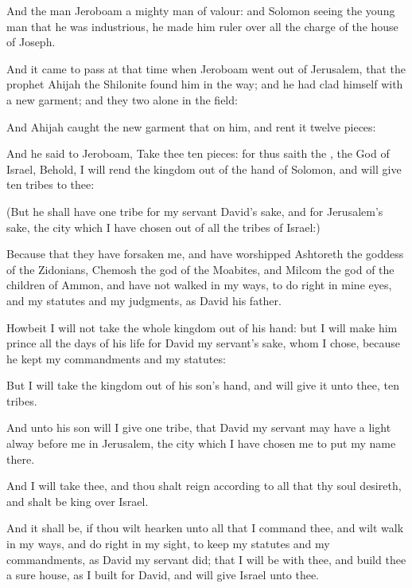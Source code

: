{And the
man
Jeroboam
{} a mighty
man of
valour: and
Solomon
seeing the young
man that he was
industrious, he made him
ruler over all the
charge of the
house of
Joseph.

And it came to pass at that
time when
Jeroboam went
out of
Jerusalem, that the
prophet
Ahijah the
Shilonite
found him in the
way; and he had
clad himself with a
new
garment; and they
two
{} alone in the
field:

And
Ahijah
caught the
new
garment that
{} on him, and
rent it
{}
twelve
pieces:

And he
said to
Jeroboam,
Take thee
ten
pieces: for thus
saith the
{}, the
God of
Israel, Behold, I will
rend the
kingdom out of the
hand of
Solomon, and will
give
ten
tribes to thee:

(But he shall have
one
tribe for my
servant
David’s sake, and for
Jerusalem’s sake, the
city which I have
chosen out of all the
tribes of
Israel:)

Because that they have
forsaken me, and have
worshipped
Ashtoreth the
goddess of the
Zidonians,
Chemosh the
god of the
Moabites, and
Milcom the
god of the
children of
Ammon, and have not
walked in my
ways, to
do
{}
right in mine
eyes, and
{} my
statutes and my
judgments, as
{}
David his
father.

Howbeit I will not
take the whole
kingdom out of his
hand: but I will
make him
prince all the
days of his
life for
David my
servant’s sake, whom I
chose, because he
kept my
commandments and my
statutes:

But I will
take the
kingdom out of his
son’s
hand, and will
give it unto thee,
{}
ten
tribes.

And unto his
son will I
give
one
tribe, that
David my
servant may have a
light
alway
before me in
Jerusalem, the
city which I have
chosen me to
put my
name there.

And I will
take thee, and thou shalt
reign according to all that thy
soul
desireth, and shalt be
king over
Israel.

And it shall be, if thou wilt
hearken unto all that I
command thee, and wilt
walk in my
ways, and
do
{}
right in my
sight, to
keep my
statutes and my
commandments, as
David my
servant
did; that I will be with thee, and
build thee a
sure
house, as I
built for
David, and will
give
Israel unto thee.

}
